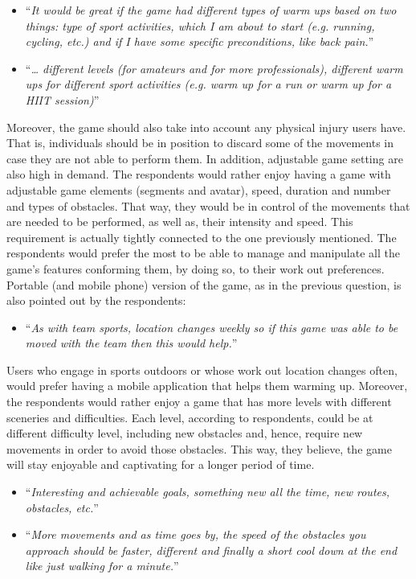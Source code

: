 \begin{itemize}
\item ``\textit{It would be great if the game had different types of warm ups based on two things:  type of sport activities, which I am about to start (e.g. running, cycling, etc.) and if I have some specific preconditions, like back pain.}''
\item ``\textit{… different levels (for amateurs and for more professionals), different warm ups for different sport activities (e.g. warm up for a run or warm up for a HIIT session)}''
\end{itemize}
Moreover, the game should also take into account any physical injury users have. That is, individuals should be in position to discard some of the movements in case they are not able to perform them. In addition, adjustable game setting are also high in demand. The respondents would rather enjoy having a game with adjustable game elements (segments and avatar), speed, duration and number and types of obstacles. That way, they would be in control of the movements that are needed to be performed, as well as, their intensity and speed. This requirement is actually tightly connected to the one previously mentioned. The respondents would prefer the most to be able to manage and manipulate all the game's features conforming them, by doing so, to their work out preferences. Portable (and mobile phone) version of the game, as in the previous question, is also pointed out by the respondents:
\begin{itemize}
\item ``\textit{As with team sports, location changes weekly so if this game was able to be moved with the team then this would help.}''
\end{itemize} 
Users who engage in sports outdoors or whose work out location changes often, would prefer having a mobile application that helps them warming up. Moreover, the respondents would rather enjoy a game that has more levels with different sceneries and difficulties. Each level, according to respondents, could be at different difficulty level, including new obstacles and, hence, require new movements in order to avoid those obstacles. This way, they believe, the game will stay enjoyable and captivating for a longer period of time.
\begin{itemize}
\item ``\textit{Interesting and achievable goals, something new all the time, new routes, obstacles, etc.}''
\item ``\textit{More movements and as time goes by, the speed of the obstacles you approach should be faster, different and finally a short cool down at the end like just walking for a minute.}''
\end{itemize}
